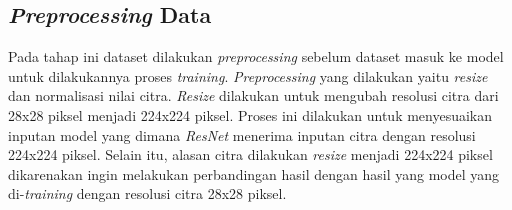 \begin{table}[h]
    \centering
    \caption{Persebaran Data}
    \label{tab:persebaran_data}

\end{table}


\subsection{\textit{Preprocessing} Data} \label{IV.Preprocessing_Dataset}
Pada tahap ini dataset dilakukan \textit{preprocessing} sebelum dataset 
masuk ke model untuk dilakukannya proses \textit{training}. \textit{Preprocessing} 
yang dilakukan yaitu \textit{resize} dan normalisasi nilai citra. \textit{Resize} 
dilakukan untuk mengubah resolusi citra dari 28x28 piksel menjadi 224x224 piksel. 
Proses ini dilakukan untuk menyesuaikan inputan model yang dimana \textit{ResNet} 
menerima inputan citra dengan resolusi 224x224 piksel. Selain itu, alasan 
citra dilakukan \textit{resize} menjadi 224x224 piksel dikarenakan ingin 
melakukan perbandingan hasil dengan hasil yang model yang di-\textit{training} 
dengan resolusi citra 28x28 piksel. \par 

